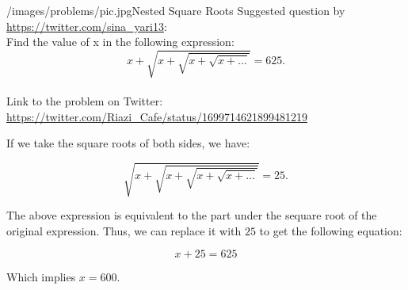 \begin{problem}{/images/problems/pic.jpg}{Nested Square Roots}
	Suggested question by \url{https://twitter.com/sina_yari13}:\\[0.2cm]
	Find the value of x in the following expression: $$ x + \sqrt{x + \sqrt{x + \sqrt{x + \ldots}}} = 625. $$\\[0.2cm] Link to the problem on Twitter: \url{https://twitter.com/Riazi_Cafe/status/1699714621899481219}
\end{problem}
\begin{solution}
If we take the square roots of both sides, we have:

$$
\sqrt{x + \sqrt{x + \sqrt{x + \sqrt{x + ...}}}} = 25.
$$

The above expression is equivalent to the part under the sequare root  of the original expression. Thus, we can replace it with $25$ to get the following equation:

$$
x + 25 = 625
$$

Which implies $x = 600$.

\end{solution}